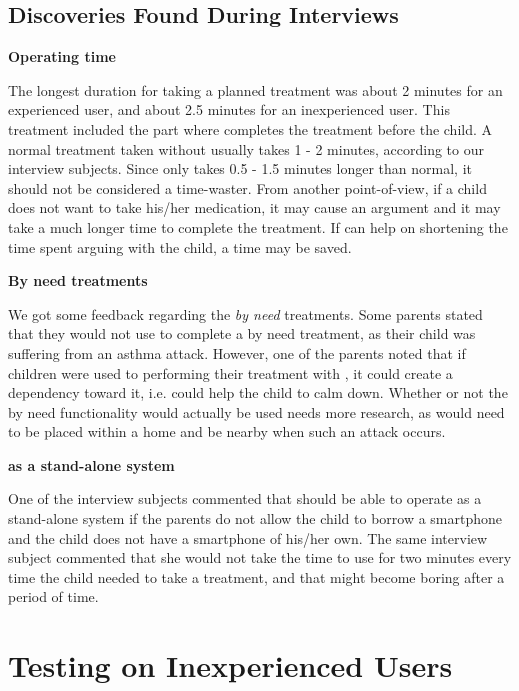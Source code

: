 \subsection{Discoveries Found During Interviews}

\textbf{Operating time}

The longest duration for taking a planned treatment was about 2 minutes for an experienced user, and about 2.5 minutes for an inexperienced user. This treatment included the part where \buddy{} completes the treatment before the child. A normal treatment taken without \ab{} usually takes 1 - 2 minutes, according to our interview subjects. Since \ab{} only takes 0.5 - 1.5 minutes longer than normal, it should not be considered a time-waster. From another point-of-view, if a child does not want to take his/her medication, it may cause an argument and it may take a much longer time to complete the treatment. If \ab{} can help on shortening the time spent arguing with the child, a time may be saved.      

\textbf{By need treatments}

We got some feedback regarding the \emph{by need} treatments. Some parents stated that they would not use \buddy{} to complete a by need treatment, as their child was suffering from an asthma attack. However, one of the parents noted that if children were used to performing their treatment with \buddy{}, it could create a dependency toward it, i.e. \buddy{} could help the child to calm down. Whether or not the by need functionality would actually be used needs more research, as \buddy{} would need to be placed within a home and be nearby when such an attack occurs. 

\textbf{\ab{} as a stand-alone system}

One of the interview subjects commented that \ab{} should be able to operate as a stand-alone system if the parents do not allow the child to borrow a smartphone and the child does not have a smartphone of his/her own. The same interview subject commented that she would not take the time to use \ab{} for two minutes every time the child needed to take a treatment, and that \ab{} might become boring after a period of time.

\section{Testing \ab{} on Inexperienced Users}
\label{chp:interaction-methods}

